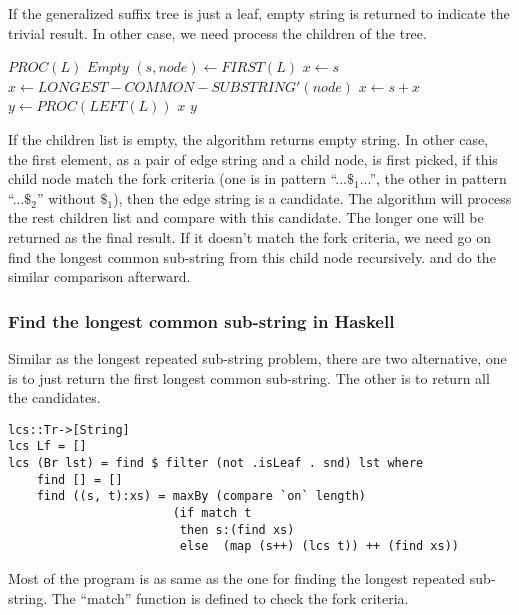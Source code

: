 \documentclass{article}
\begin{document}
If the generalized suffix tree is just a leaf, empty string is
returned to indicate the trivial result. In other case, we
need process the children of the tree.

\begin{algorithmic}
\STATE $PROC(L)$
    \RETURN $Empty$
  \ELSE
    \STATE $(s, node) \leftarrow FIRST(L)$
      \STATE $x \leftarrow s$
    \ELSE
      \STATE $x \leftarrow LONGEST-COMMON-SUBSTRING'(node)$
        \STATE $x \leftarrow s + x$
      \ENDIF
    \ENDIF
    \STATE $y \leftarrow PROC(LEFT(L))$
      \RETURN $x$
    \ELSE
      \RETURN $y$
    \ENDIF
  \ENDIF
\end{algorithmic}

If the children list is empty, the algorithm returns empty 
string. In other case, the first element, as a pair of edge
string and a child node, is first picked, if this child node
match the fork criteria (one is in pattern ``...$\$_1$...'',
the other in pattern ``...$\$_2$'' without $\$_1$), then the edge string is
a candidate. The algorithm will process the rest children 
list and compare with this candidate. The longer one will 
be returned as the final result.
If it doesn't match the fork criteria, we need go on find the
longest common sub-string from this child node recursively.
and do the similar comparison afterward.

\subsubsection*{Find the longest common sub-string in Haskell}
Similar as the longest repeated sub-string problem, there
are two alternative, one is to just return the first longest
common sub-string. The other is to return all the candidates.

\lstset{language=Haskell}
\begin{lstlisting}
lcs::Tr->[String]
lcs Lf = []
lcs (Br lst) = find $ filter (not .isLeaf . snd) lst where
    find [] = []
    find ((s, t):xs) = maxBy (compare `on` length) 
                       (if match t 
                        then s:(find xs)
                        else  (map (s++) (lcs t)) ++ (find xs))
\end{lstlisting} %

Most of the program is as same as the one for finding the longest
repeated sub-string. The ``match'' function is defined to check
the fork criteria.
\end{document}
